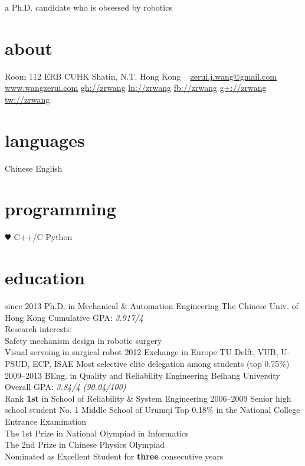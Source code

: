 \documentclass[]{friggeri-cv}
\begin{document}
       {a Ph.D. candidate who is obsessed by robotics}


\begin{aside}
  \section{about}
    Room 112
    ERB
    CUHK
    Shatin, N.T.
    Hong Kong
    ~
    \href{mailto:zerui.j.wang@gmail.com}{zerui.j.wang@gmail.com}
    \href{http://www.wangzerui.com}{www.wangzerui.com}
    \href{https://github.com/zrwang}{gh://zrwang}
    \href{https://www.linkedin.com/in/zrwang}{ln://zrwang}
    \href{https://www.facebook.com/zrwang.cuhk}{fb://zrwang}
    \href{https://plus.google.com/u/0/115306810481973645007/posts}{g+://zrwang}
    \href{https://twitter.com/wangzerui}{tw://zrwang}
  \section{languages}
    Chinese
    English
  \section{programming}
    {\color{red} $\varheartsuit$} C++/C
    Python
\end{aside}

\section{education}
\begin{entrylist}
  \entry
    {since 2013}
    {Ph.D. {\normalfont in Mechanical \& Automation Engineering}}
    {The Chinese Univ. of Hong Kong}
    {Cumulative GPA: \emph{3.917/4} \\
     Research interests: \\
     Safety mechanism design in robotic surgery \\
     Visual servoing in surgical robot}
  \entry
    {2012}
    {Exchange {\normalfont in Europe}}
    {TU Delft, VUB, U-PSUD, ECP, ISAE}
    {Most selective elite delegation among students (top 0.75\%)}
  \entry
    {2009–2013}
    {BEng. {\normalfont in Quality and Reliability Engineering}}
    {Beihang University}
    {Overall GPA: \emph{3.84/4 (90.04/100)} \\
     Rank \textbf{1st} in School of Reliability \& System Engineering}
  \entry
    {2006–2009}
    {Senior high school student}
    {No. 1 Middle School of Urumqi}
    {Top 0.18\%  in the National College Entrance Examination \\
    The 1st Prize in National Olympiad in Informatics \\
    The 2nd Prize in Chinese Physics Olympiad \\
    Nominated as Excellent Student for \textbf{three} consecutive years}
\end{entrylist}
\end{document}

